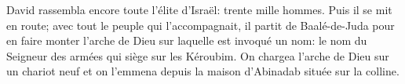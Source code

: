David rassembla encore toute l’élite d’Israël: trente mille hommes.
Puis il se mit en route; avec tout le peuple qui l’accompagnait,
	il partit de Baalé-de-Juda pour en faire monter l’arche de Dieu
		sur laquelle est invoqué un nom:
	le nom du Seigneur des armées qui siège sur les Kéroubim.
On chargea l’arche de Dieu sur un chariot neuf
	et on l’emmena depuis la maison d’Abinadab située sur la colline.
